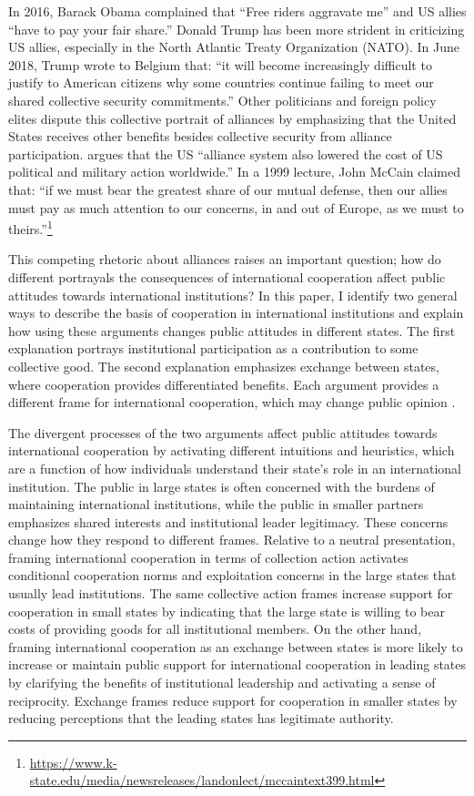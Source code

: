 \documentclass[12pt]{article}
\begin{document}
In 2016, Barack Obama complained that ``Free riders aggravate me'' and US allies ``have to pay your fair share.'' 
Donald Trump has been more strident in criticizing US allies, especially in the North Atlantic Treaty Organization (NATO). 
In June 2018, Trump wrote to Belgium that: ``it will become increasingly difficult to justify to American citizens why some countries continue failing to meet our shared collective security commitments.''
Other politicians and foreign policy elites dispute this collective portrait of alliances by emphasizing that the United States receives other benefits besides collective security from alliance participation. 
\citet[pg. 129]{RappHooper2020} argues that the US ``alliance system also lowered the cost of US political and military action worldwide.'' 
In a 1999 lecture, John McCain claimed that: ``if we must bear the greatest share of our mutual defense, then our allies must pay as much attention to our concerns, in and out of Europe, as we must to theirs.''\footnote{\url{https://www.k-state.edu/media/newsreleases/landonlect/mccaintext399.html}} 


This competing rhetoric about alliances raises an important question; how do different portrayals the consequences of international cooperation affect public attitudes towards international institutions? 
In this paper, I identify two general ways to describe the basis of cooperation in international institutions and explain how using these arguments changes public attitudes in different states. 
The first explanation portrays institutional participation as a contribution to some collective good. 
The second explanation emphasizes exchange between states, where cooperation provides differentiated benefits.
Each argument provides a different frame for international cooperation, which may change public opinion \citep{ChongDruckman2007}.  


The divergent processes of the two arguments affect public attitudes towards international cooperation by activating different intuitions and heuristics, which are a function of how individuals understand their state's role in an international institution. 
The public in large states is often concerned with the burdens of maintaining international institutions, while the public in smaller partners emphasizes shared interests and institutional leader legitimacy.
These concerns change how they respond to different frames. 
Relative to a neutral presentation, framing international cooperation in terms of collection action activates conditional cooperation norms and exploitation concerns in the large states that usually lead institutions. 
The same collective action frames increase support for cooperation in small states by indicating that the large state is willing to bear costs of providing goods for all institutional members. 
On the other hand, framing international cooperation as an exchange between states is more likely to increase or maintain public support for international cooperation in leading states by clarifying the benefits of institutional leadership and activating a sense of reciprocity. 
Exchange frames reduce support for cooperation in smaller states by reducing perceptions that the leading states has legitimate authority.  
\end{document}
